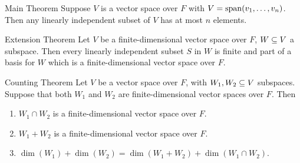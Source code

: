 \documentclass[class=article, crop=false]{standalone}
\begin{document}
  \begin{theorem}{Main Theorem}
    Suppose $V$ is a vector space over $F$ with $V = \operatorname{span}(v_1,\dotsc,v_n)$. Then any linearly independent subset of $V$ has at most $n$ elements.
  \end{theorem}
  \begin{theorem}{Extension Theorem}
    Let $V$ be a finite-dimensional vector space over $F$, $W\subseteq V$ a subspace. Then every linearly independent subset $S$ in $W$ is finite and part of a basis for $W$ which is a finite-dimensional vector space over $F$.
  \end{theorem}
  \begin{theorem}{Counting Theorem}
    Let $V$ be a vector space over $F$, with $W_1,W_2\subseteq V$ subspaces. Suppose that both $W_1$ and $W_2$ are finite-dimensional vector spaces over $F$. Then
    \begin{enumerate}[label=(\alph*)]
      \item $W_1\cap W_2$ is a finite-dimensional vector space over $F$.
      \item $W_1 + W_2$ is a finite-dimensional vector space over $F$.
      \item $\dim(W_1) + \dim(W_2) = \dim(W_1 + W_2) + \dim(W_1\cap W_2)$.
    \end{enumerate}
  \end{theorem}
\end{document}
